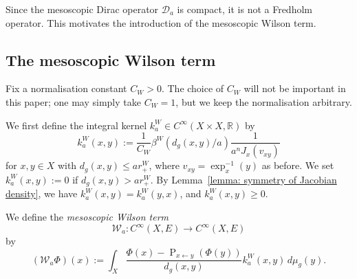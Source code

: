\documentclass[a4paper,oneside,12pt]{amsart}
\theoremstyle{plain}
\theoremstyle{definition}
\theoremstyle{remark}
\newcommand{\R}{\mathbb{R}}
\newcommand{\dvol}{d\mu}
\newcommand{\paralleltransport}[2]{\operatorname{P}_{#2 \gets #1}}
\newcommand{\mesoscopicDiracoperator}[1][a]{\mathcal{D}_{#1}}
\newcommand{\mesoscopicWilsonterm}[1][a]{\mathcal{W}_{#1}}
\newcommand{\cutoff}{\beta}
\newcommand{\cutoffWilson}{\cutoff^W}
\newcommand{\integralkernel}{k}
\newcommand{\kernelWilson}{\integralkernel_a^W}
\begin{document}
Since the mesoscopic Dirac operator $\mesoscopicDiracoperator$ is compact, it is not a Fredholm operator.
This motivates the introduction of the mesoscopic Wilson term.

\subsection{The mesoscopic Wilson term}\label{subsection: the mesoscopic Wilson term}

Fix a normalisation constant $C_W > 0$.
The choice of $C_W$ will not be important in this paper; one may simply take $C_W=1$, but we keep the normalisation arbitrary.

We first define the integral kernel $\kernelWilson \in C^{\infty}(X \times X, \R)$ by
\begin{equation}
  \kernelWilson(x,y) := \frac{1}{C_W} \cutoffWilson(d_g(x,y)/a) \frac{1}{a^nJ_x(v_{xy})}
\end{equation}
for $x,y \in X$ with $d_g(x,y)\le ar_+^W$, where $v_{xy} = \exp_x^{-1}(y)$ as before.
We set $\kernelWilson(x,y) := 0$ if $d_g(x,y)> ar_+^W$.
By Lemma~\ref{lemma: symmetry of Jacobian density}, we have $\kernelWilson(x,y) = \kernelWilson(y,x)$, and $\kernelWilson(x,y) \ge 0$.

We define the \emph{mesoscopic Wilson term}
\begin{equation}
  \mesoscopicWilsonterm \colon C^{\infty}(X,E) \to C^{\infty}(X,E)
\end{equation}
by
\begin{equation}
  (\mesoscopicWilsonterm \Phi)(x) := \int_X \frac{\Phi(x) - \paralleltransport{y}{x}(\Phi(y))}{d_g(x,y)} \kernelWilson(x,y) \,\dvol_g(y).
\end{equation}
\end{document}
